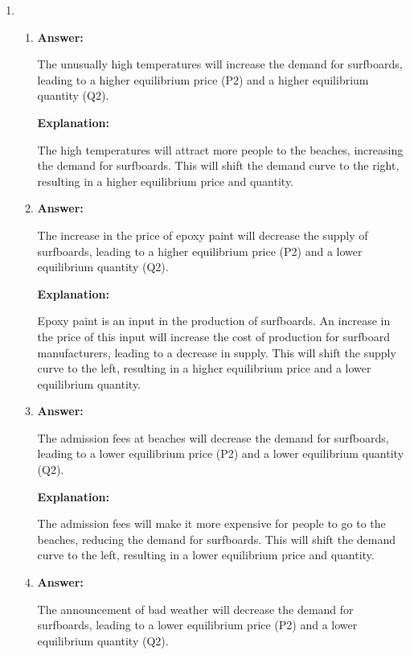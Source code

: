 \documentclass{article}
\begin{document}
\begin{enumerate}
    \item
          \begin{enumerate}
              \item \textbf{Answer:}

                    The unusually high temperatures will increase the demand for surfboards, leading to a higher equilibrium price (P2) and a higher equilibrium quantity (Q2).

                    \textbf{Explanation:}

                    The high temperatures will attract more people to the beaches, increasing the demand for surfboards. This will shift the demand curve to the right, resulting in a higher equilibrium price and quantity.

              \item \textbf{Answer:}

                    The increase in the price of epoxy paint will decrease the supply of surfboards, leading to a higher equilibrium price (P2) and a lower equilibrium quantity (Q2).

                    \textbf{Explanation:}

                    Epoxy paint is an input in the production of surfboards. An increase in the price of this input will increase the cost of production for surfboard manufacturers, leading to a decrease in supply. This will shift the supply curve to the left, resulting in a higher equilibrium price and a lower equilibrium quantity.

              \item \textbf{Answer:}

                    The admission fees at beaches will decrease the demand for surfboards, leading to a lower equilibrium price (P2) and a lower equilibrium quantity (Q2).

                    \textbf{Explanation:}

                    The admission fees will make it more expensive for people to go to the beaches, reducing the demand for surfboards. This will shift the demand curve to the left, resulting in a lower equilibrium price and quantity.

              \item \textbf{Answer:}

                    The announcement of bad weather will decrease the demand for surfboards, leading to a lower equilibrium price (P2) and a lower equilibrium quantity (Q2).


\end{enumerate}
\end{enumerate}
\end{document}
